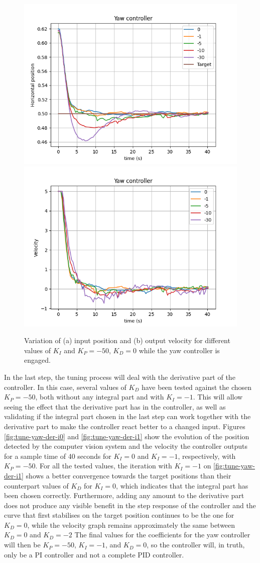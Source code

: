 \begin{figure}
  \centering
  \includegraphics[width=.45\linewidth]{img/pid/yaw/yaw_pos_p50_int_d0.png}
  \includegraphics[width=.45\linewidth]{img/pid/yaw/yaw_vel_p50_int_d0.png}
  \caption{Variation of (a) input position and (b) output velocity for different values of $K_{I}$ and $K_P=-50$, $K_D=0$ while the yaw controller is engaged.}\label{fig:tune-yaw-int-50}
\end{figure}

In the last step, the tuning process will deal with the derivative part of the controller.
In this case, several values of $K_D$ have been tested against the chosen $K_P=-50$, both without any integral part and with $K_I=-1$.
This will allow seeing the effect that the derivative part has in the controller, as well as validating if the integral part chosen in the last step can work together with the derivative part to make the controller react better to a changed input.
Figures \ref{fig:tune-yaw-der-i0} and \ref{fig:tune-yaw-der-i1} show the evolution of the position detected by the computer vision system and the velocity the controller outputs for a sample time of 40 seconds for $K_I=0$ and $K_I=-1$, respectively, with $K_P=-50$.
For all the tested values, the iteration with $K_I=-1$ on \ref{fig:tune-yaw-der-i1} shows a better convergence towards the target positions than their counterpart values of $K_D$ for $K_I=0$, which indicates that the integral part has been chosen correctly.
Furthermore, adding any amount to the derivative part does not produce any visible benefit in the step response of the controller and the curve that first stabilises on the target position continues to be the one for $K_D=0$, while the velocity graph remains approximately the same between $K_D=0$ and $K_D=-2$
The final values for the coefficients for the yaw controller will then be $K_P=-50$, $K_I=-1$, and $K_D=0$, so the controller will, in truth, only be a PI controller and not a complete PID controller.


